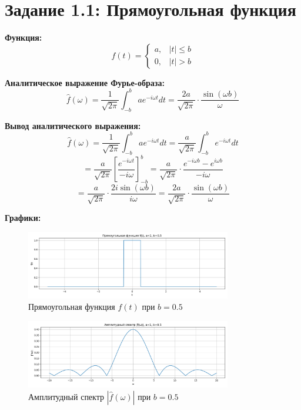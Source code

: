 \section*{Задание 1.1: Прямоугольная функция}

\textbf{Функция:}
\[
f(t) = 
\begin{cases}
a, & |t| \le b \\
0, & |t| > b
\end{cases}
\]

\textbf{Аналитическое выражение Фурье-образа:}
\[
\hat{f}(\omega) = \frac{1}{\sqrt{2\pi}} \int_{-b}^{b} a e^{-i \omega t} dt = \frac{2a}{\sqrt{2\pi}} \cdot \frac{\sin(\omega b)}{\omega}
\]

\textbf{Вывод аналитического выражения:}
\[
\hat{f}(\omega) = \frac{1}{\sqrt{2\pi}} \int_{-b}^{b} a e^{-i \omega t} dt = \frac{a}{\sqrt{2\pi}} \int_{-b}^{b} e^{-i \omega t} dt
\]
\[
= \frac{a}{\sqrt{2\pi}} \left[ \frac{e^{-i \omega t}}{-i \omega} \right]_{-b}^{b} = \frac{a}{\sqrt{2\pi}} \cdot \frac{e^{-i \omega b} - e^{i \omega b}}{-i \omega}
\]
\[
= \frac{a}{\sqrt{2\pi}} \cdot \frac{2i \sin(\omega b)}{i \omega} = \frac{2a}{\sqrt{2\pi}} \cdot \frac{\sin(\omega b)}{\omega}
\]

\textbf{Графики:}

\begin{figure}[H]
    \centering
    \includegraphics[width=0.8\textwidth]{rect_function_b0.5.png}
    \caption{Прямоугольная функция $f(t)$ при $b = 0.5$}
\end{figure}

\begin{figure}[H]
    \centering
    \includegraphics[width=0.8\textwidth]{rect_fourier_b0.5.png}
    \caption{Амплитудный спектр $|\hat{f}(\omega)|$ при $b = 0.5$}
\end{figure}

